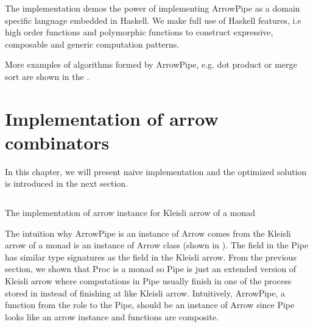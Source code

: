 The implementation demos the power of implementing ArrowPipe as a domain specific language embedded in Haskell. We make full use of Haskell features, i.e high order functions and polymorphic functions to construct expressive, composable and generic computation patterns.

More examples of algorithms formed by ArrowPipe, e.g. dot product or merge sort are shown in the .
\section{Implementation of arrow combinators} \label{arrowPipe:impl}
In this chapter, we will present naive implementation and the optimized solution is introduced in the next section.

\begin{listing}[ht]
    \inputminted{Haskell}{arrow/kleisli.hs} 
    \caption{The implementation of arrow instance for Kleisli arrow of a monad}
    \label{arrow:code:kleisli}
\end{listing}
The intuition why ArrowPipe is an instance of Arrow comes from the Kleisli arrow of a monad is an instance of Arrow class (shown in ). The  field in the Pipe has similar type signatures as the  field in the Kleisli arrow. From the previous section, we shown that Proc is a monad so Pipe is just an extended version of Kleisli arrow where computations in Pipe usually finish in one of the process stored in  instead of finishing at  like Kleisli arrow. Intuitively, ArrowPipe, a function from the role to the Pipe, should be an instance of Arrow since Pipe looks like an arrow instance and functions are composite.


